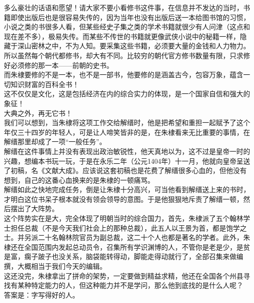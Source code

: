 \begin{multicols}{\theparacolNo}
多么豪壮的话语和愿望！请大家不要小看修书这件事，在信息并不发达的当时，书籍即使出版后也是很容易失传的，因为当年也没有出版后送一本给图书馆的习惯，小说之类的书很多人看，但某些经史子集之类的学术书籍就很少有人问津（这点和现在差不多），极易失传。而某些不传世的书籍就更像武侠小说中的秘籍一样，隐藏于深山密林之中，不为人知。要采集这些书籍，必须要大量的金钱和人力物力。所以虽然每个朝代都修书，却大有不同。比较穷的朝代官方修书数量有限，只求修好必须修的那一本——前朝的史书。\\

而朱棣要修的不是一本，也不是一部书，他要修的是涵盖古今，包容万象，蕴含一切知识财富的百科全书！\\

这不仅仅是文化，这是包括经济在内的综合实力的体现，是一个国家自信和强大的象征！\\

大典之外，再无它书！\\

我们可以想到，当朱棣将这项工作交给解缙时，他是把希望和重担一起赋予了这个年仅三十四岁的年轻人，可是让人啼笑皆非的是，在朱棣看来无比重要的事情，在解缙那里却成了一项“一般任务”。\\

解缙在这件事情上并没有表现出政治敏锐性，他天真地以为，这不过是皇帝一时的兴趣，想编本书玩一玩，于是在永乐二年（公元1404年）十一月，他就向皇帝呈送了初稿，名《文献大成》。应该说这套初稿也是花费了解缙很多心血的，但他没有想到，自己的这番心血换来的是朱棣的一顿痛骂。\\

解缙如此之快地完成任务，倒是让朱棣十分高兴，可当他看到解缙送上来的书时，才明白这位书呆子根本就没有领会领导的意图。于是他狠狠地斥责了解缙一顿，然后摆出了大阵势。\\

这个阵势实在是大，完全体现了明朝当时的综合国力，首先，朱棣派了五个翰林学士担任总裁（不是今天我们社会上的那种总裁），此五人以王景为首，都是饱学之士。并另派二十名翰林院官员为副总裁，这二十个人也都是著名的学者。此外，朱棣还在全国范围内发起总动员令，召集所有学识渊博的人，不管你是老是少，是贫是富，瘸子跛子也没关系，脑袋能转得动，脚能走得动就行了，全部召集来做编撰，大概相当于我们今天的编辑。\\

这还没完，朱棣拿出了拼命的架势，一定要做到精益求精，他还在全国各个州县寻找有某种特定能力的人，但这种能力并不是学问，那么他到底找的是什么人呢？\\

答案是：字写得好的人。\\


\end{multicols}
